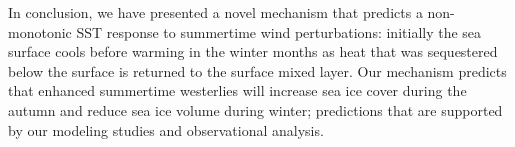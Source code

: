 \documentclass{ametsocV5}
\begin{document}
In conclusion, we have presented a novel mechanism that predicts a non-monotonic SST response to summertime wind perturbations: initially the sea surface cools before warming in the winter months as heat that was sequestered below the surface is returned to the surface mixed layer. Our mechanism predicts that enhanced summertime westerlies will increase sea ice cover during the autumn and reduce sea ice volume during winter; predictions that are supported by our modeling studies and observational analysis.





\end{document}
